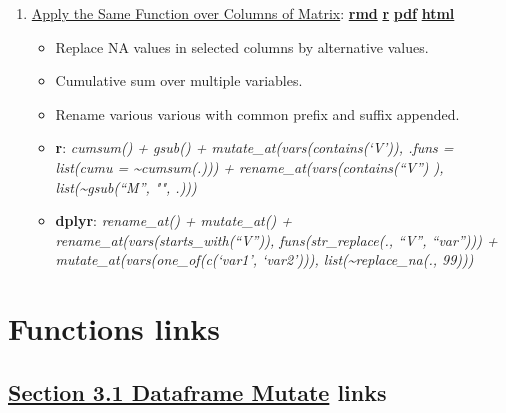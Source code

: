 \documentclass[
]{book}
\providecommand{\tightlist}{%
  \setlength{\itemsep}{0pt}\setlength{\parskip}{0pt}}
\begin{document}
\begin{enumerate}
\def\labelenumi{\arabic{enumi}.}
\tightlist
\item
  \href{https://fanwangecon.github.io/R4Econ/summarize/multivar/htmlpdfr/fs_func_multivar.html}{Apply the Same Function over Columns of Matrix}: \href{https://github.com/FanWangEcon/R4Econ/blob/master/summarize/multivar//fs_func_multivar.Rmd}{\textbf{rmd}} \textbar{} \href{https://github.com/FanWangEcon/R4Econ/blob/master/summarize/multivar/htmlpdfr/fs_func_multivar.R}{\textbf{r}} \textbar{} \href{https://github.com/FanWangEcon/R4Econ/blob/master/summarize/multivar/htmlpdfr/fs_func_multivar.pdf}{\textbf{pdf}} \textbar{} \href{https://fanwangecon.github.io/R4Econ/summarize/multivar/htmlpdfr/fs_func_multivar.html}{\textbf{html}}

  \begin{itemize}
  \tightlist
  \item
    Replace NA values in selected columns by alternative values.
  \item
    Cumulative sum over multiple variables.
  \item
    Rename various various with common prefix and suffix appended.
  \item
    \textbf{r}: \emph{cumsum() + gsub() + mutate\_at(vars(contains(`V')), .funs = list(cumu = \textasciitilde cumsum(.))) + rename\_at(vars(contains(``V'') ), list(\textasciitilde gsub(``M'', "", .)))}
  \item
    \textbf{dplyr}: \emph{rename\_at() + mutate\_at() + rename\_at(vars(starts\_with(``V'')), funs(str\_replace(., ``V'', ``var''))) + mutate\_at(vars(one\_of(c(`var1', `var2'))), list(\textasciitilde replace\_na(., 99)))}
  \end{itemize}
\end{enumerate}

\hypertarget{functions-links}{%
\section{Functions links}\label{functions-links}}

\hypertarget{section-3.1-dataframe-mutatedataframe-mutate-links}{%
\subsection{\texorpdfstring{\protect\hyperlink{dataframe-mutate}{Section 3.1 Dataframe Mutate} links}{Section 3.1 Dataframe Mutate links}}\label{section-3.1-dataframe-mutatedataframe-mutate-links}}
\end{document}
